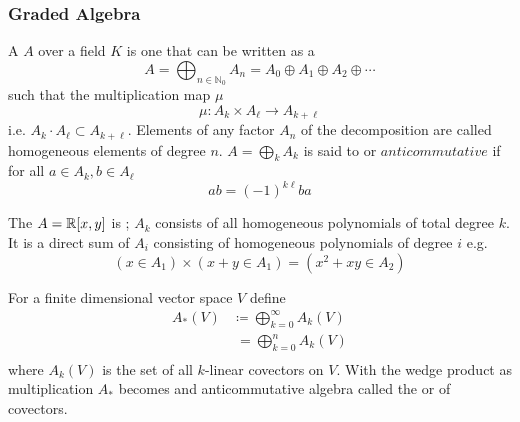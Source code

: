 \subsubsection{Graded Algebra}
\newcommand{\gradedA}{A = \bigoplus_k A_k}

\begin{definition}

A  \(A\) over a field \(K\) is one that can be written as a 
\[
     A=\bigoplus _{n\in \mathbb {N} _{0}}A_{n}=A_{0}\oplus A_{1}\oplus A_{2}\oplus \cdots 
\]
such that the multiplication map \(\mu\)
\[
    \mu \colon A_k \times A_\ell \rightarrow A_{k + \ell}    
\]
i.e. \(A_k\cdot A_\ell \subset A_{k+\ell}\). Elements of any factor \(A_n\) of the decomposition are called homogeneous elements of degree \(n\).
\(\gradedA\) is said to  or \(anticommutative\) if for all \(a\in A_k, b\in A_\ell\)
\[
ab = (-1)^{k\ell} ba
\]

\end{definition}

\begin{example}
    The 
    \(A=\mathbb{R}[x,y]\) is ; \(A_k\) consists of all homogeneous polynomials of total degree \(k\). It is a direct sum of \(A_{i}\) consisting of homogeneous polynomials of degree \(i\) e.g.
    \[
        \left( x \in A_1 \right)
        \times  
        \left( x+y \in A_1  \right) = 
        \left( x^2+xy \in A_2 \right) 
    \]
\end{example}

\begin{definition}
    For a finite dimensional vector space \(V\) define 
    \begin{equation}
        \begin{split}
            A_*(V) &\coloneqq \bigoplus_{k=0}^\infty A_k(V)  \\
            &\;= \bigoplus_{k=0}^n A_k(V) \\
        \end{split}
    \end{equation}
    where \(A_k(V)\) is the set of all \(k\)-linear covectors on \(V\).
    With the wedge product as multiplication \(A_*\) becomes and anticommutative algebra called the  or  of covectors.
\end{definition}